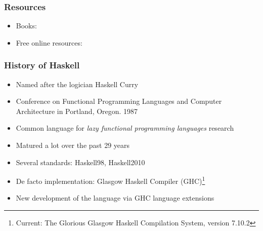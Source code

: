 \documentclass[pdftex,landscape,final,handout,british]{beamer}
\begin{document}
\begin{frame}
    \frametitle{Resources}
 
    \begin{itemize}

    \item Books:

        \beamertemplatebookbibitems
        \begin{thebibliography}{99}
        \end{thebibliography}

    \item Free online resources:
        \begin{thebibliography}{99}

        \end{thebibliography}
    \end{itemize}

    
    \end{frame}


    \begin{frame}
    \frametitle{History of Haskell}

    \begin{itemize}
    \item Named after the logician Haskell Curry
    \item Conference on Functional Programming Languages and Computer Architecture in Portland, Oregon. 1987
    \item Common language for \textit{lazy functional programming languages} research
    \item Matured a lot over the past 29 years
    \item Several standards: Haskell98, Haskell2010
    \end{itemize}

    \pause

    \begin{itemize}
        \item De facto implementation: Glasgow Haskell Compiler
            (GHC)\footnote{Current: The Glorious Glasgow Haskell
                Compilation System, version 7.10.2}
    \item New development of the language via GHC language extensions
    \end{itemize}

    \end{frame}
\end{document}
